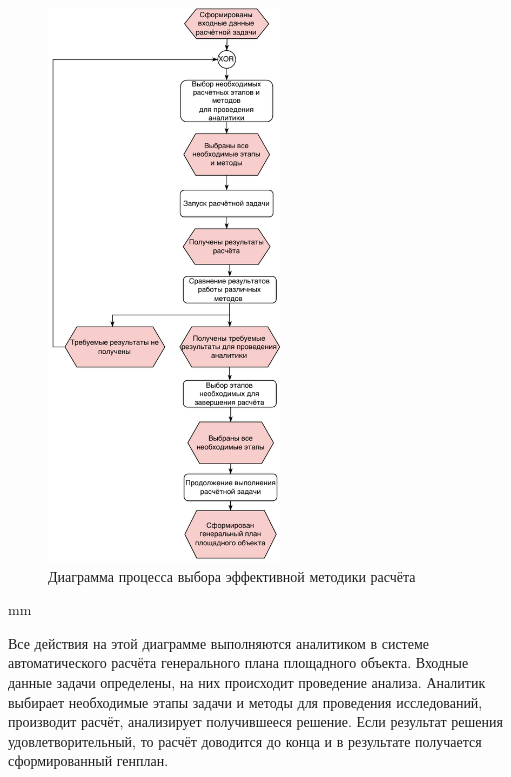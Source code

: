 \begin{figure}[H]
	\hspace*{-2.5 cm}\includegraphics[width=0.55\textwidth, left]{analysis/pictures/usecases/analytics_epc}
	\caption{Диаграмма процесса выбора эффективной методики расчёта}
	\label{pic:analysis__usecases-analytics-epc}
\end{figure}
 mm

Все действия на этой диаграмме выполняются аналитиком в системе автоматического
расчёта генерального плана площадного объекта.
Входные данные задачи определены, на них происходит проведение анализа.
Аналитик выбирает необходимые этапы задачи и методы для проведения исследований, производит расчёт,
анализирует получившееся решение. Если результат решения удовлетворительный,
то расчёт доводится до конца и в результате получается сформированный генплан.